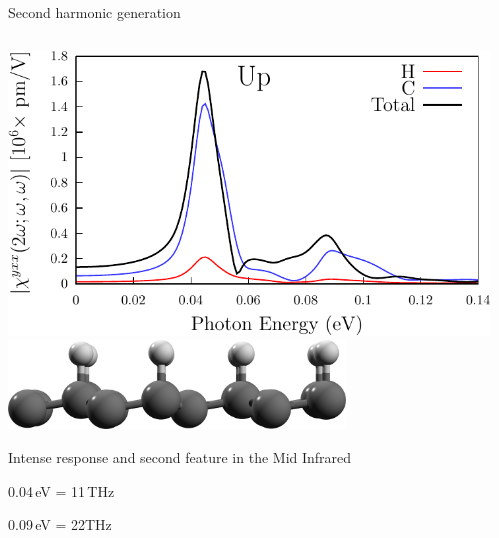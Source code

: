 \documentclass{beamer}
\begin{document}
\begin{frame}

\begin{center}
{\Large Second harmonic generation}
\end{center}

\begin{columns}

\begin{center}
\small 

\vspace{-5mm}
\includegraphics[width=1.0\textwidth]{figs/plots/shg-lay-up.pdf}
\vspace{3mm}
\includegraphics[width=0.7\textwidth]{figs/up2.png}

\vspace{7mm}
Intense response and second feature in the Mid Infrared

0.04\,eV = 11\,THz

0.09\,eV = 22THz

\end{center}


\begin{center}
\small


\end{center}
\end{columns}
\end{frame}
\end{document}
